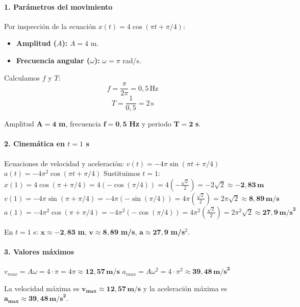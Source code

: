 \paragraph{1. Parámetros del movimiento}
Por inspección de la ecuación $x(t) = 4\cos(\pi t + \pi/4)$:
\begin{itemize}
    \item \textbf{Amplitud ($A$):} $A = 4$ m.
    \item \textbf{Frecuencia angular ($\omega$):} $\omega = \pi$ rad/s.
\end{itemize}
Calculamos $f$ y $T$:
$$f = \frac{\pi}{2\pi} = 0,5 \, \text{Hz}$$
$$T = \frac{1}{0,5} = 2 \, \text{s}$$
\begin{cajaresultado}
    Amplitud $\boldsymbol{A=4}$ \textbf{m}, frecuencia $\boldsymbol{f=0,5}$ \textbf{Hz} y periodo $\boldsymbol{T=2}$ \textbf{s}.
\end{cajaresultado}

\paragraph{2. Cinemática en $t=1$ s}
Ecuaciones de velocidad y aceleración:
$v(t) = -4\pi\sin(\pi t + \pi/4)$
$a(t) = -4\pi^2\cos(\pi t + \pi/4)$
Sustituimos $t=1$:
$x(1) = 4\cos(\pi + \pi/4) = 4(-\cos(\pi/4)) = 4(-\frac{\sqrt{2}}{2}) = -2\sqrt{2} \approx \boldsymbol{-2,83 \, \textbf{m}}$
$v(1) = -4\pi\sin(\pi + \pi/4) = -4\pi(-\sin(\pi/4)) = 4\pi(\frac{\sqrt{2}}{2}) = 2\pi\sqrt{2} \approx \boldsymbol{8,89 \, \textbf{m/s}}$
$a(1) = -4\pi^2\cos(\pi + \pi/4) = -4\pi^2(-\cos(\pi/4)) = 4\pi^2(\frac{\sqrt{2}}{2}) = 2\pi^2\sqrt{2} \approx \boldsymbol{27,9 \, \textbf{m/s}^2}$
\begin{cajaresultado}
    En $t=1$ s: $\boldsymbol{x \approx -2,83}$ \textbf{m}, $\boldsymbol{v \approx 8,89}$ \textbf{m/s}, $\boldsymbol{a \approx 27,9}$ \textbf{m/s$^2$}.
\end{cajaresultado}

\paragraph{3. Valores máximos}
$v_{max} = A\omega = 4 \cdot \pi = 4\pi \approx \boldsymbol{12,57 \, \textbf{m/s}}$
$a_{max} = A\omega^2 = 4 \cdot \pi^2 \approx \boldsymbol{39,48 \, \textbf{m/s}^2}$
\begin{cajaresultado}
    La velocidad máxima es $\boldsymbol{v_{max} \approx 12,57 \, \textbf{m/s}}$ y la aceleración máxima es $\boldsymbol{a_{max} \approx 39,48 \, \textbf{m/s}^2}$.
\end{cajaresultado}

